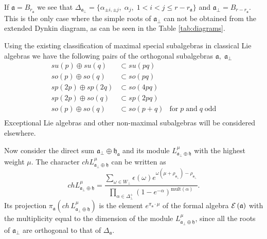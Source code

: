 \documentclass[a4paper,12pt]{article}
\theoremstyle{definition} \newtheorem{Def}{Definition}
\begin{document}
If $\mathfrak{a}=B_{r_{\mathfrak{a}}}$  we see that $\Delta_{\mathfrak{a}_{\bot}}=\{\alpha_{\pm i,\pm j},\;\alpha_j,\; 1<i<j\leq r-r_{\mathfrak{a}}\}$ and $\mathfrak{a}_{\bot}=B_{r-r_{\mathfrak{a}}}$. This is the only case where the simple roots of $\mathfrak{a}_{\bot}$ can not be obtained from the extended Dynkin diagram, as can be seen in the Table \ref{tab:diagrams}.
  
Using the existing classification of maximal special subalgebras in classical Lie algebras \cite{dynkin1952semisimple} we have the following pairs of the orthogonal subalgebras $\mathfrak{a},\;\mathfrak{a}_{\bot}$
\begin{equation}
  \label{eq:42}
  \begin{array}{lll}
      su(p)\oplus su(q) & \subset su(pq) &\\
      so(p)\oplus so(q) & \subset so(pq) &\\
      sp(2p)\oplus sp(2q) & \subset so(4pq)&\\
      sp(2p)\oplus so(q) & \subset sp(2pq)&\\
      so(p)\oplus so(q) & \subset so(p+q)& \text{for}\;p\;\text{and}\;q\;\text{odd}\\
  \end{array}
\end{equation}
Exceptional Lie algebras and other non-maximal subalgebras will be considered elsewhere.

Now consider the direct sum $\mathfrak{a}_{\bot}\oplus\mathfrak{h}_{\mathfrak{a}}$ and its module $L^{\mu}_{\mathfrak{a}_{\bot}\oplus \mathfrak{h}}$
with the highest weight $\mu$. The character $ch L^{\mu}_{\mathfrak{a}_{\bot}\oplus \mathfrak{h}}$ can be written as
\begin{equation}
  \label{eq:41}
  ch L^{\mu}_{\mathfrak{a}_{\bot}\oplus \mathfrak{h}}= \frac{\sum_{\omega\in W_{\bot}} \epsilon(\omega) e^{\omega(\mu+\rho_{\mathfrak{a}_{\bot}})-\rho_{\mathfrak{a}_{\bot}}}}{\prod_{\alpha\in\Delta^{+}_{\bot}}(1-e^{-\alpha})^{\mathrm{mult}(\alpha)}}.
\end{equation}
Its projection $\pi_{\mathfrak{a}}(ch\, L^{\mu}_{\mathfrak{a}_{\bot}\oplus \mathfrak{h}})$ is the element $e^{\pi_{\mathfrak{a}} \cdot\mu}$ of the formal algebra ${\cal E}\left( \mathfrak{a}\right)$ with the multiplicity equal to the dimension of the module $L^{\mu}_{\mathfrak{a}_{\bot}\oplus \mathfrak{h}}$, since all the roots of $\mathfrak{a}_{\bot}$ are orthogonal to  that of $\Delta_{\mathfrak{a}}$.
\end{document}
